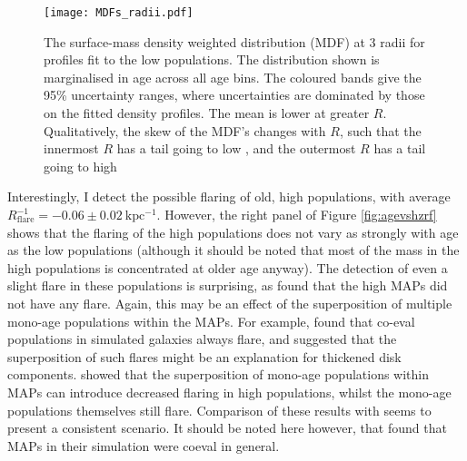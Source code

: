 \begin{figure}
	\texttt{[image: MDFs\_radii.pdf]}
 	\centering
   \caption[Surface-mass denisty weighted \feh{} distribution in 3 radial bins, as found from measurement of mono-age, mono-\feh{} populations in APOGEE DR12]{The surface-mass density weighted \feh{} distribution (MDF) at 3 radii for profiles fit to the low \afe{} populations. The distribution shown is marginalised in age across all age bins. The coloured bands give the 95\% uncertainty ranges, where uncertainties are dominated by those on the fitted density profiles. The mean \feh{} is lower at greater $R$. Qualitatively, the skew of the MDF's changes with $R$, such that the innermost $R$ has a tail going to low \feh{}, and the outermost $R$ has a tail going to high \feh{}}
     \label{fig:mdf}
 \end{figure}

Interestingly, I detect the possible flaring of old, high \afe{} populations, with average $R_{\mathrm{flare}}^{-1} = -0.06 \pm 0.02\ \mathrm{kpc^{-1}}$. However, the right panel of Figure \ref{fig:agevshzrf} shows that the flaring of the high \afe{} populations does not vary as strongly with age as the low \afe{} populations (although it should be noted that most of the mass in the high \afe{} populations is concentrated at older age anyway). The detection of even a slight flare in these populations is surprising, as \citet{2016ApJ...823...30B} found that the high \afe{} MAPs did not have any flare. Again, this may be an effect of the superposition of multiple mono-age populations within the MAPs. For example, \citet{2015ApJ...804L...9M} found that co-eval populations in simulated galaxies always flare, and suggested that the superposition of such flares might be an explanation for thickened disk components. \citet{2017ApJ...834...27M} showed that the superposition of mono-age populations within MAPs can introduce decreased flaring in high \afe{} populations, whilst the mono-age populations themselves still flare. Comparison of these results with \citet{2016ApJ...823...30B} seems to present a consistent scenario. It should be noted here however, that \citet{2013MNRAS.436..625S} found that MAPs in their simulation were coeval in general.

